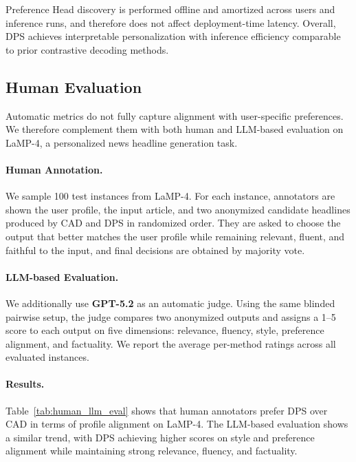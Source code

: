 \documentclass[11pt]{article}
\begin{document}
Preference Head discovery is performed offline and amortized across users and inference runs, and therefore does not affect deployment-time latency.
Overall, DPS achieves interpretable personalization with inference efficiency comparable to prior contrastive decoding methods.





\subsection{Human Evaluation}
\label{sec:human_eval}

Automatic metrics do not fully capture alignment with user-specific preferences.
We therefore complement them with both human and LLM-based evaluation on LaMP-4, a personalized news headline generation task.

\paragraph{Human Annotation.}
We sample 100 test instances from LaMP-4.
For each instance, annotators are shown the user profile, the input article, and two anonymized candidate headlines produced by CAD and DPS in randomized order.
They are asked to choose the output that better matches the user profile while remaining relevant, fluent, and faithful to the input, and final decisions are obtained by majority vote.

\paragraph{LLM-based Evaluation.}
We additionally use \textbf{GPT-5.2} as an automatic judge.
Using the same blinded pairwise setup, the judge compares two anonymized outputs and assigns a 1--5 score to each output on five dimensions: relevance, fluency, style, preference alignment, and factuality.
We report the average per-method ratings across all evaluated instances.


\paragraph{Results.}
Table~\ref{tab:human_llm_eval} shows that human annotators prefer DPS over CAD in terms of profile alignment on LaMP-4.
The LLM-based evaluation shows a similar trend, with DPS achieving higher scores on style and preference alignment while maintaining strong relevance, fluency, and factuality.
\end{document}
